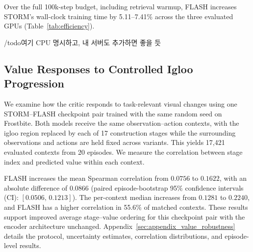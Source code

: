 \documentclass{article} %
\begin{document}
Over the full 100k-step budget, including retrieval warmup, FLASH increases STORM's wall-clock training time by 5.11--7.41\% across the three evaluated GPUs (Table~\ref{tab:efficiency}).

/todo{여기 CPU 명시하고, 내 서버도 추가하면 좋을 듯}

\begin{table}[!t]
\centering
\begin{minipage}{0.5\textwidth}
\centering
\caption{Training time on Atari 100k.}
\label{tab:efficiency}
\small
\setlength{\tabcolsep}{3pt}
\renewcommand{\arraystretch}{1.2}
\end{minipage}
\end{table}

\subsection{Value Responses to Controlled Igloo Progression}
\label{subsec:robustness_value}
We examine how the critic responds to task-relevant visual changes using one STORM--FLASH checkpoint pair trained with the same random seed on Frostbite. Both models receive the same observation--action contexts, with the igloo region replaced by each of 17 construction stages while the surrounding observations and actions are held fixed across variants. This yields 17,421 evaluated contexts from 20 episodes. We measure the correlation between stage index and predicted value within each context.

FLASH increases the mean Spearman correlation from $0.0756$ to $0.1622$, with an absolute difference of $0.0866$ (paired episode-bootstrap 95\% confidence intervals (CI): $[0.0506,\,0.1213]$). The per-context median increases from $0.1281$ to $0.2240$, and FLASH has a higher correlation in 55.6\% of matched contexts. These results support improved average stage--value ordering for this checkpoint pair with the encoder architecture unchanged. Appendix~\ref{sec:appendix_value_robustness} details the protocol, uncertainty estimates, correlation distributions, and episode-level results.
\end{document}
